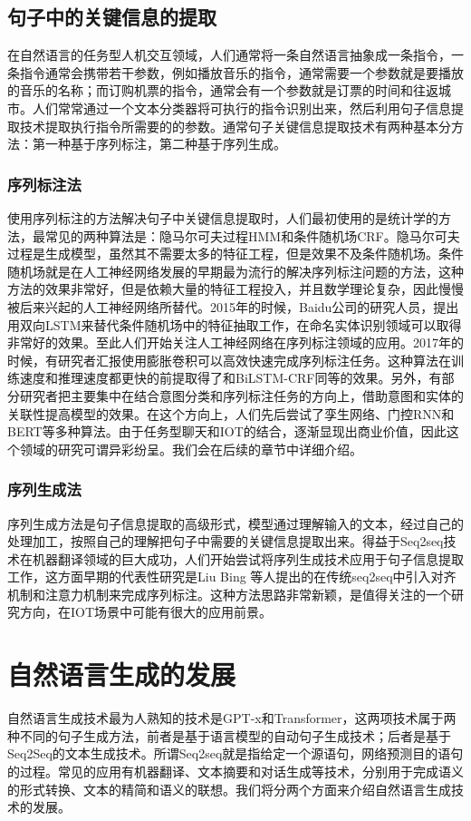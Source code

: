 \documentclass[twoside,a4paper,12pt]{book}%
\begin{document}
\subsection{句子中的关键信息的提取}

在自然语言的任务型人机交互领域，人们通常将一条自然语言抽象成一条指令，一条指令通常会携带若干参数，例如播放音乐的指令，通常需要一个参数就是要播放的音乐的名称；而订购机票的指令，通常会有一个参数就是订票的时间和往返城市。人们常常通过一个文本分类器将可执行的指令识别出来，然后利用句子信息提取技术提取执行指令所需要的的参数。通常句子关键信息提取技术有两种基本分方法：第一种基于序列标注，第二种基于序列生成。
\subsubsection{序列标注法}
使用序列标注的方法解决句子中关键信息提取时，人们最初使用的是统计学的方法，最常见的两种算法是：隐马尔可夫过程\gls{HMM}和条件随机场\gls{CRF}。隐马尔可夫过程是生成模型，虽然其不需要太多的特征工程，但是效果不及条件随机场。条件随机场就是在人工神经网络发展的早期最为流行的解决序列标注问题的方法，这种方法的效果非常好，但是依赖大量的特征工程投入，并且数学理论复杂，因此慢慢被后来兴起的人工神经网络所替代。2015年的时候，Baidu公司的研究人员，提出用双向\gls{LSTM}来替代条件随机场中的特征抽取工作，在命名实体识别领域可以取得非常好的效果。至此人们开始关注人工神经网络在序列标注领域的应用。2017年的时候，有研究者汇报使用膨胀卷积可以高效快速完成序列标注任务。这种算法在训练速度和推理速度都更快的前提取得了和BiLSTM-\gls{CRF}同等的效果。另外，有部分研究者把主要集中在结合意图分类和序列标注任务的方向上，借助意图和实体的关联性提高模型的效果。在这个方向上，人们先后尝试了孪生网络、门控\gls{RNN}和\gls{BERT}等多种算法。由于任务型聊天和IOT的结合，逐渐显现出商业价值，因此这个领域的研究可谓异彩纷呈。我们会在后续的章节中详细介绍。
\subsubsection{序列生成法}
序列生成方法是句子信息提取的高级形式，模型通过理解输入的文本，经过自己的处理加工，按照自己的理解把句子中需要的关键信息提取出来。得益于Seq2seq技术在机器翻译领域的巨大成功，人们开始尝试将序列生成技术应用于句子信息提取工作，这方面早期的代表性研究是Liu Bing 等人提出的在传统seq2seq中引入对齐机制和注意力机制来完成序列标注。这种方法思路非常新颖，是值得关注的一个研究方向，在IOT场景中可能有很大的应用前景。
\section{自然语言生成的发展}
自然语言生成技术最为人熟知的技术是\gls{GPT}-x和Transformer，这两项技术属于两种不同的句子生成方法，前者是基于语言模型的自动句子生成技术；后者是基于Seq2Seq的文本生成技术。所谓Seq2seq就是指给定一个源语句，网络预测目的语句的过程。常见的应用有机器翻译、文本摘要和对话生成等技术，分别用于完成语义的形式转换、文本的精简和语义的联想。我们将分两个方面来介绍自然语言生成技术的发展。
\end{document}

